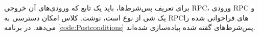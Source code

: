 برای تعریف پس‌شرط‌ها، باید یک تابع که ورودی‌‌های آن خروجی RPC، ورودی RPC و یک شی از نوع 
است، نوشت. کلاس 
امکان دسترسی به RPCهای فراخوانی شده را می‌دهد. در برنامه
\ref{code:Postconditions}
پس‌شرط‌های گفته شده پیاده‌سازی شده‌اند.

\singlespacing
\begin{figure}
	\begin{LTR}
		
	\end{LTR}
\end{figure}
\doublespacing
